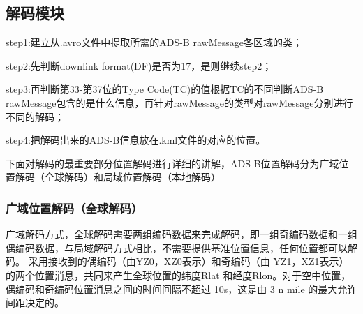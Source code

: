 \subsection{解码模块}
step1:建立从.avro文件中提取所需的ADS-B rawMessage各区域的类；

step2:先判断downlink format(DF)是否为17，是则继续step2；

step3:再判断第33-第37位的Type Code(TC)的值根据TC的不同判断ADS-B rawMessage包含的是什么信息，再针对rawMessage的类型对rawMessage分别进行不同的解码；

step4:把解码出来的ADS-B信息放在.kml文件的对应的位置。

下面对解码的最重要部分位置解码进行详细的讲解，ADS-B位置解码分为广域位置解码（全球解码）和局域位置解码（本地解码）
\subsubsection{广域位置解码（全球解码）} 
广域解码方式，全球解码需要两组编码数据来完成解码，即一组奇编码数据和一组偶编码数据，与局域解码方式相比，不需要提供基准位置信息，任何位置都可以解码。 采用接收到的偶编码（由YZ0，XZ0表示）和奇编码（由 YZ1，XZ1表示）的两个位置消息，共同来产生全球位置的纬度Rlat 和经度Rlon。对于空中位置，偶编码和奇编码位置消息之间的时间间隔不超过 10s，这是由 3 n mile 的最大允许间距决定的。
 
